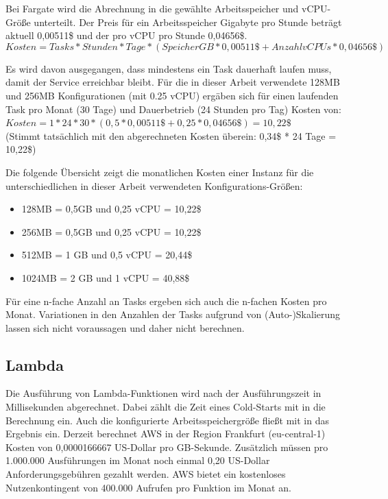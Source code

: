 Bei Fargate wird die Abrechnung in die gewählte Arbeitsspeicher und vCPU-Größe unterteilt. Der Preis für ein Arbeitsspeicher Gigabyte pro Stunde beträgt aktuell 0,00511\$ und der pro vCPU pro Stunde 0,04656\$.  \\


\begin{equation}
Kosten = Tasks * Stunden * Tage * (SpeicherGB * 0,00511\$ + AnzahlvCPUs * 0,04656\$)
\end{equation}

Es wird davon ausgegangen, dass mindestens ein Task dauerhaft laufen muss, damit der Service erreichbar bleibt. Für die in dieser Arbeit verwendete 128MB und 256MB Konfigurationen (mit 0.25 vCPU) ergäben sich für einen laufenden Task pro Monat (30 Tage) und Dauerbetrieb (24 Stunden pro Tag) Kosten von: \\

$Kosten = 1 * 24 * 30 * (0,5 * 0,00511\$ + 0,25 * 0,04656\$) = 10,22\$$ \\
(Stimmt tatsächlich mit den abgerechneten Kosten überein: 0,34\$ * 24 Tage = 10,22\$)

Die folgende Übersicht zeigt die monatlichen Kosten einer Instanz für die unterschiedlichen in dieser Arbeit verwendeten Konfigurations-Größen:

\begin{itemize}
    \item 128MB = 0,5GB und 0,25 vCPU = 10,22\$
    \item 256MB = 0,5GB und 0,25 vCPU = 10,22\$
    \item 512MB = 1  GB und 0,5  vCPU = 20,44\$
    \item 1024MB = 2 GB und 1    vCPU = 40,88\$
\end{itemize}
Für eine n-fache Anzahl an Tasks ergeben sich auch die n-fachen Kosten pro Monat. Variationen in den Anzahlen der Tasks aufgrund von (Auto-)Skalierung lassen sich nicht voraussagen und daher nicht berechnen.


\subsection{Lambda}
Die Ausführung von Lambda-Funktionen wird nach der Ausführungszeit in Millisekunden abgerechnet. Dabei zählt die Zeit eines Cold-Starts mit in die Berechnung ein. Auch die konfigurierte Arbeitsspeichergröße fließt mit in das Ergebnis ein. Derzeit berechnet AWS in der Region Frankfurt (eu-central-1) Kosten von 0,0000166667 US-Dollar pro GB-Sekunde\cite{noauthor_lambda_nodate}. Zusätzlich müssen pro 1.000.000 Ausführungen im Monat noch einmal 0,20 US-Dollar Anforderungsgebühren gezahlt werden. AWS bietet ein kostenloses Nutzenkontingent von 400.000 Aufrufen pro Funktion im Monat an.

